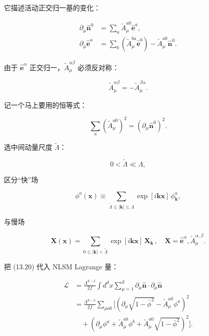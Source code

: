 它描述活动正交归一基的变化：

\begin{align*}
\partial_ {\mu} \hat {\mathbf {n}} ^ {0} & = \sum_ {a} \tilde {A} _ {\mu} ^ {a 0} \hat {\mathbf {e}} ^ {a} ,\\
\partial_ {\mu} \hat {\mathbf {e}} ^ {a} & = \sum_ {b} \left( \tilde {A} _ {\mu} ^ {ba} \hat {\mathbf {e}} ^ {b} \right) - \tilde {A} _ {\mu} ^ {a 0} \hat {\mathbf {n}} ^ {0} .
\tag{13.23}
\end{align*}

由于 $\hat{\mathbf{e}}^{\alpha}$ 正交归一，$\tilde{A}_{\mu}^{\alpha \beta}$ 必须反对称：

\begin{equation*}
\tilde {A} _ {\mu} ^ {\alpha \beta} = - \tilde {A} _ {\mu} ^ {\beta \alpha}.
\tag{13.24}
\end{equation*}

记一个马上要用的恒等式：

\begin{equation*}
\sum_ {a} \left( \tilde {A} _ {\mu} ^ {a 0} \right) ^ {2} = \left( \partial_ {\mu} \hat {\mathbf {n}} ^ {0} \right) ^ {2}.
\tag{13.25}
\end{equation*}

选中间动量尺度 $\tilde{\Lambda}$：

\begin{equation*}
0 < \tilde {\Lambda} \ll \Lambda ,
\tag{13.26}
\end{equation*}

区分“快”场

\begin{equation*}
\phi^ {a} ( \mathbf {x} ) \equiv \sum_{\tilde {\Lambda} \leq | \mathbf {k} | \leq \Lambda} \exp [ i \mathbf {kx} ] \, \phi_{\mathbf {k}} ^ {a} ,
\tag{13.27}
\end{equation*}

与慢场

\begin{equation*}
\mathbf {X} ( \mathbf {x} ) = \sum_{0 \leq | \mathbf {k} | < \tilde {\Lambda}} \exp [ i \mathbf {kx} ] \, \mathbf {X} _ {\mathbf {k}} \, , \quad \mathbf {X} = \hat {\mathbf {e}} ^ {\alpha}, \tilde {A} _ {\mu} ^ {\alpha , \beta}.
\tag{13.28}
\end{equation*}

把 (13.20) 代入 NLSM Lagrange 量：

\begin{align*}
\mathcal {L} & = \frac {\Lambda^ {d - 2}}{2 f} \int d ^ {d} x \sum_{\mu = 1} ^ {d} \partial_ {\mu} \hat {\mathbf {n}} \cdot \partial_ {\mu} \hat {\mathbf {n}}\\
& = \frac {\Lambda^ {d - 2}}{2 f} \sum_{\mu ab} \Big[ \left( \partial_ {\mu} \sqrt {1 - \bar {\phi} ^ {2}} - \tilde {A} _ {\mu} ^ {a 0} \phi^ {a} \right) ^ {2}\\
& \quad + \left( \partial_ {\mu} \phi^ {a} + \tilde {A} _ {\mu} ^ {ab} \phi^ {b} + \tilde {A} _ {\mu} ^ {a 0} \sqrt {1 - \bar {\phi} ^ {2}} \right) ^ {2} \Big] .
\tag{13.29}
\end{align*}

